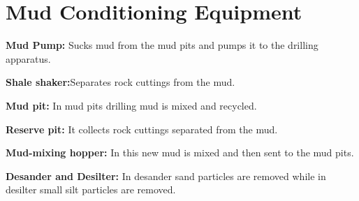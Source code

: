 \chapter{Mud Conditioning Equipment}

\textbf{Mud Pump:} Sucks mud from the mud pits and pumps it to the drilling apparatus.

\vspace{1em}

\textbf{Shale shaker:}Separates rock cuttings from the mud.

\vspace{1em}

\textbf{Mud pit:} In mud pits drilling mud is mixed and recycled. 

\vspace{1em}

\textbf{Reserve pit:} It collects rock cuttings separated from the mud.

\vspace{1em}

\textbf{Mud-mixing hopper:} In this new mud is mixed and then sent to the mud pits.

\vspace{1em}

\textbf{Desander and Desilter:} In desander sand particles are removed while in desilter small silt particles are removed.

